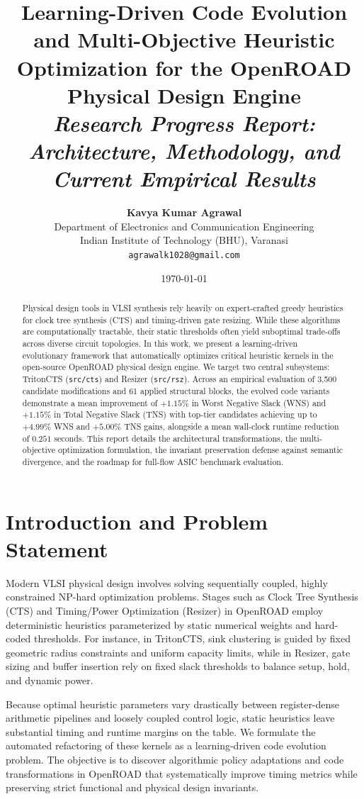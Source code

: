 \documentclass[10pt,twocolumn]{article}
\title{\LARGE\textbf{Learning-Driven Code Evolution and Multi-Objective Heuristic Optimization for the OpenROAD Physical Design Engine}\\[0.3em]
\large\textit{Research Progress Report: Architecture, Methodology, and Current Empirical Results}}
\author{\textbf{Kavya Kumar Agrawal}\\
Department of Electronics and Communication Engineering\\
Indian Institute of Technology (BHU), Varanasi\\
\texttt{agrawalk1028@gmail.com}}
\date{\today}
\begin{document}
\maketitle

\begin{abstract}
Physical design tools in VLSI synthesis rely heavily on expert-crafted greedy heuristics for clock tree synthesis (CTS) and timing-driven gate resizing. While these algorithms are computationally tractable, their static thresholds often yield suboptimal trade-offs across diverse circuit topologies. In this work, we present a learning-driven evolutionary framework that automatically optimizes critical heuristic kernels in the open-source OpenROAD physical design engine. We target two central subsystems: TritonCTS (\texttt{src/cts}) and Resizer (\texttt{src/rsz}). Across an empirical evaluation of 3,500 candidate modifications and 61 applied structural blocks, the evolved code variants demonstrate a mean improvement of $+1.15\%$ in Worst Negative Slack (WNS) and $+1.15\%$ in Total Negative Slack (TNS) with top-tier candidates achieving up to $+4.99\%$ WNS and $+5.00\%$ TNS gains, alongside a mean wall-clock runtime reduction of $0.251$ seconds. This report details the architectural transformations, the multi-objective optimization formulation, the invariant preservation defense against semantic divergence, and the roadmap for full-flow ASIC benchmark evaluation.
\end{abstract}

\section{Introduction and Problem Statement}
Modern VLSI physical design involves solving sequentially coupled, highly constrained NP-hard optimization problems. Stages such as Clock Tree Synthesis (CTS) and Timing/Power Optimization (Resizer) in OpenROAD employ deterministic heuristics parameterized by static numerical weights and hard-coded thresholds. For instance, in TritonCTS, sink clustering is guided by fixed geometric radius constraints and uniform capacity limits, while in Resizer, gate sizing and buffer insertion rely on fixed slack thresholds to balance setup, hold, and dynamic power.

Because optimal heuristic parameters vary drastically between register-dense arithmetic pipelines and loosely coupled control logic, static heuristics leave substantial timing and runtime margins on the table. We formulate the automated refactoring of these kernels as a learning-driven code evolution problem. The objective is to discover algorithmic policy adaptations and code transformations in OpenROAD that systematically improve timing metrics while preserving strict functional and physical design invariants.
\end{document}
